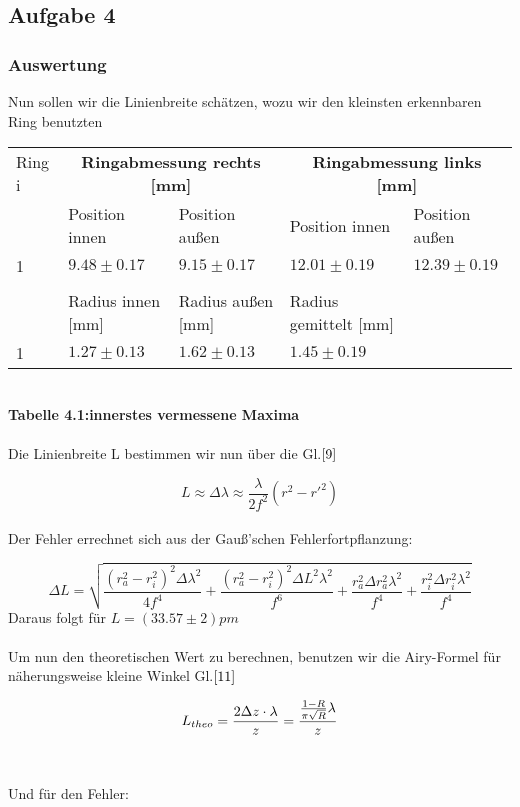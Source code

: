 \subsection{Aufgabe 4}
\subsubsection{Auswertung}
Nun sollen wir die Linienbreite schätzen, wozu wir den kleinsten erkennbaren Ring benutzten 
\\

\begin{tabular}{l|l|l|l|l|}
Ring i & \multicolumn{2}{c|}{\textbf{Ringabmessung rechts [mm]}} & \multicolumn{2}{c|}{\textbf{Ringabmessung links [mm]}} \\
		& Position innen & Position außen & Position innen & Position außen\\	
\hline
1 & $9.48\pm 0.17$ & $9.15\pm 0.17$ & $12.01\pm 0.19$ & $12.39\pm 0.19$ \\
& & & & \\
& Radius innen [mm] & Radius außen [mm] & Radius gemittelt [mm] &\\ \hline
1 & $1.27\pm 0.13$ & $1.62\pm 0.13$ & $1.45\pm 0.19$\\
\end{tabular}\\
\textbf{Tabelle 4.1:innerstes vermessene Maxima}\\
\\
Die Linienbreite L bestimmen wir nun über die Gl.$\eqref{9}$

\begin{equation}
\label{9}
L\approx \Delta \lambda \approx \frac {\lambda}{2f^2} (r^2 - r'^2)
\end{equation}\\
Der Fehler errechnet sich aus der Gauß'schen Fehlerfortpflanzung:

\begin{equation}
\Delta L=\sqrt{\frac{(r_{a}^2-r_{i}^2)^2\Delta \lambda^2}{4f^4}+\frac{(r_{a}^2-r_{i}^2)^2\Delta L^2\lambda^2}{f^6}+\frac{r_{a}^2\Delta r_{a}^2\lambda^2}{f^4}+\frac{r_{i}^2\Delta r_{i}^2\lambda^2}{f^4}}
\end{equation}
Daraus folgt für $L=(33.57\pm 2)pm$\\
\\
Um nun den theoretischen Wert zu berechnen, benutzen wir die Airy-Formel für näherungsweise kleine Winkel Gl.$\eqref{11}$

\begin{equation}\notag
L_{theo}=\frac{2 \Delta z\cdot \lambda}{z}=\frac{\frac {1-R}{\pi \sqrt {R}}\lambda}{z} 
\end{equation}\\
\\
Und für den Fehler:

